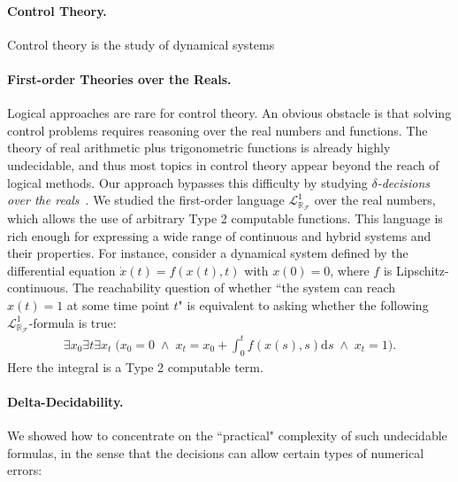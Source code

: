 \documentclass[10pt]{article}
\newcommand{\lrf}{\mathcal{L}_{\mathbb{R}_{\mathcal{F}}}}
\theoremstyle{definition}
\begin{document}
\paragraph{Control Theory.} Control theory is the study of dynamical systems 



\paragraph{First-order Theories over the Reals.} Logical approaches are rare for control theory. An obvious obstacle is that solving control problems requires reasoning over the real numbers and functions. The theory of real arithmetic plus trigonometric functions is already highly undecidable, and thus most topics in control theory appear beyond the reach of logical methods. Our approach bypasses this difficulty by studying {\em $\delta$-decisions over the reals}~\cite{DBLP:conf/lics/GaoAC12}. We studied the first-order language $\lrf^1$ over the real numbers, which allows the use of arbitrary Type 2 computable functions. This language is rich enough for expressing a wide range of continuous and hybrid systems and their properties. For instance, consider a dynamical system defined by the differential equation $\dot{x}(t) = f(x(t),t)$ with $x(0)= 0$, where $f$ is Lipschitz-continuous. The reachability question of whether ``the system can reach $x(t)=1$ at some time point $t$" is equivalent to asking whether the following $\mathcal{L}^1_{\mathbb{R}_{\mathcal{F}}}$-formula is true:
\begin{eqnarray*}\exists x_0 \exists t \exists x_t\; \bigg(x_0 = 0 \;\wedge\; x_t = x_0 + \int_{0}^t f(x(s),s)\mathrm{d}s\; \wedge\; x_t = 1\bigg).\end{eqnarray*}
Here the integral is a Type 2 computable term. 



\paragraph{Delta-Decidability.} We showed how to concentrate on the ``practical" complexity of such undecidable formulas, in the sense that the decisions can allow certain types of numerical errors:
\end{document}
